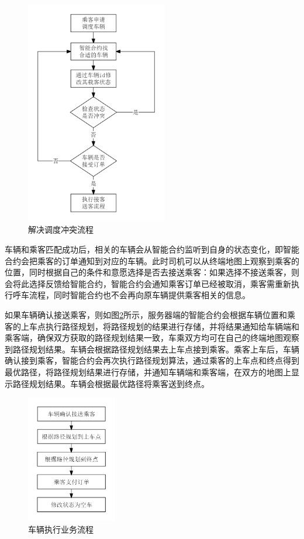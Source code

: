 \begin{figure}[h]
  \centering
  \includegraphics[width=0.55\textwidth]{figures/解决调度冲突}
  \caption{解决调度冲突流程}\label{fig:conflict}
\end{figure}

车辆和乘客匹配成功后，相关的车辆会从智能合约监听到自身的状态变化，即智能合约会把乘客的订单通知到对应的车辆。此时司机可以从终端地图上观察到乘客的位置，同时根据自己的条件和意愿选择是否去接送乘客：如果选择不接送乘客，则会将此选择反馈给智能合约，智能合约会通知乘客订单已经被取消，乘客需重新执行呼车流程，同时智能合约也不会再向原车辆提供乘客相关的信息。

如果车辆确认接送乘客，则如图\ref{fig:routing}所示，服务器端的智能合约会根据车辆位置和乘客的上车点执行路径规划，将路径规划的结果进行存储，并将结果通知给车辆端和乘客端，确保双方获取的路径规划结果一致，车乘双方均可在自己的终端地图观察到路径规划结果。车辆会根据路径规划结果去上车点接到乘客。乘客上车后，车辆确认接到乘客，智能合约会再次执行路径规划算法，通过乘客的上车点和终点得到最优路径，将路径规划结果进行存储，并通知车辆端和乘客端，在双方的地图上显示路径规划结果。车辆会根据最优路径将乘客送到终点。

\begin{figure}[h]
  \centering
  \includegraphics[width=0.35\textwidth]{figures/按导航执行业务}
  \caption{车辆执行业务流程}\label{fig:routing}
\end{figure}

